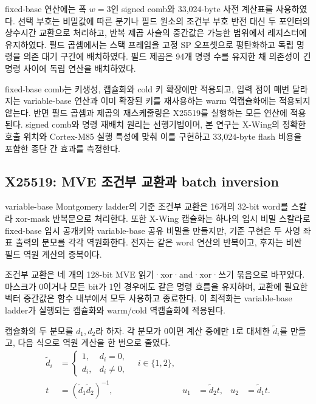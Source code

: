 \documentclass[runningheads,orivec]{llncs}
\newcommand{\xwing}{X-Wing}
\begin{document}
fixed-base 연산에는 폭 $w=3$인 signed comb와 33,024-byte 사전 계산표를 사용하였다.
선택 부호는 비밀값에 따른 분기나 필드 원소의 조건부 부호 반전 대신 두 포인터의
상수시간 교환으로 처리하고, 반복 제곱 사슬의 중간값은 가능한 범위에서 레지스터에
유지하였다. 필드 곱셈에서는 스택 프레임을 고정 SP 오프셋으로 평탄화하고 독립 명령을
의존 대기 구간에 배치하였다. 필드 제곱은 94개 명령 수를 유지한 채 의존성이 긴 명령
사이에 독립 연산을 배치하였다.

fixed-base comb는 키생성, 캡슐화와 cold 키 확장에만 적용되고, 입력 점이 매번 달라지는
variable-base 연산과 이미 확장된 키를 재사용하는 warm 역캡슐화에는 적용되지 않는다.
반면 필드 곱셈과 제곱의 재스케줄링은 X25519를 실행하는 모든 연산에 적용된다. signed
comb와 명령 재배치 원리는 선행기법이며, 본 연구는 \xwing{}의 정확한 호출 위치와
Cortex-M85 실행 특성에 맞춰 이를 구현하고 33,024-byte flash 비용을 포함한 종단 간
효과를 측정한다.

\subsection{X25519: MVE 조건부 교환과 batch inversion}

variable-base Montgomery ladder의 기준 조건부 교환은 16개의 32-bit word를 스칼라
xor-mask 반복문으로 처리한다. 또한 \xwing{} 캡슐화는 하나의 임시 비밀 스칼라로
fixed-base 임시 공개키와 variable-base 공유 비밀을 만들지만, 기준 구현은 두 사영
좌표 출력의 분모를 각각 역원화한다. 전자는 같은 word 연산의 반복이고, 후자는 비싼
필드 역원 계산의 중복이다.

조건부 교환은 네 개의 128-bit MVE 읽기·xor·and·xor·쓰기 묶음으로 바꾸었다. 마스크가
0이거나 모든 bit가 1인 경우에도 같은 명령 흐름을 유지하며, 교환에 필요한 벡터
중간값은 함수 내부에서 모두 사용하고 종료한다. 이 최적화는 variable-base ladder가
실행되는 캡슐화와 warm/cold 역캡슐화에 적용된다.

캡슐화의 두 분모를 $d_1,d_2$라 하자. 각 분모가 0이면 계산 중에만 1로 대체한
$\widetilde d_i$를 만들고, 다음 식으로 역원 계산을 한 번으로 줄였다.
\begin{equation}
\begin{aligned}
\widetilde d_i & =
\begin{cases}
1, & d_i=0,\\
d_i, & d_i\neq0,
\end{cases}
\quad i\in\{1,2\},\\
t & = (\widetilde d_1\widetilde d_2)^{-1}, &
u_1 & = \widetilde d_2t, &
u_2 & = \widetilde d_1t .
\end{aligned}
\label{eq:paired-inversion}
\end{equation}
\end{document}
